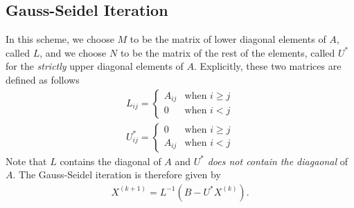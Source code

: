 \subsection{Gauss-Seidel Iteration}
In this scheme, we choose $M$ to be the matrix of lower diagonal elements of $A$, called $L$, and we choose $N$ to be the matrix of the rest of the elements, called $U^*$ for the \textit{strictly} upper diagonal elements of $A$. 
Explicitly, these two matrices are defined as follows
\begin{align*}
L_{ij} =
\begin{cases}
A_{ij} & \text{when } i \geq j \\
0 & \text{when } i < j 
\end{cases} \\
U^*_{ij} =
\begin{cases}
0 & \text{when } i \geq j \\
A_{ij} & \text{when } i < j 
\end{cases}
\end{align*}
Note that $L$ contains the diagonal of $A$ and $U^*$ \textit{does not contain the diagaonal} of $A$. The Gauss-Seidel iteration is therefore given by
\begin{align*}
X^{(k+1)} = L^{-1}\left(B - U^*X^{(k)}\right).
\end{align*}


